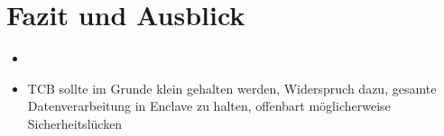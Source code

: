 
\chapter{Fazit und Ausblick}


\begin{itemize}
	\item 	\item TCB sollte im Grunde klein gehalten werden, Widerspruch dazu, gesamte Datenverarbeitung in Enclave zu halten, offenbart möglicherweise Sicherheitslücken
\end{itemize}